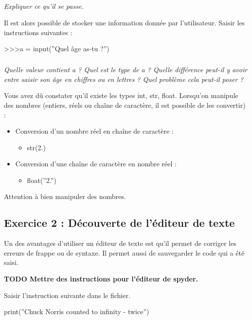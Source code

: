\documentclass[10pt]{article}
\begin{document}
\subparagraph{} 
\textit{Expliquer ce qu’il se passe.}


Il est alors possible de stocker une information donnée par l’utilisateur. Saisir les instructions suivantes : 

\begin{py}
\begin{python}
>>>a = input(''Quel âge as-tu ?'')
\end{python}
\end{py}

\subparagraph{} 
\textit{Quelle valeur contient a ? Quel est le type de a ? Quelle différence peut-il y avoir entre saisir son âge en chiffres ou en lettres ? Quel problème cela peut-il poser ?}


\begin{rem}
Vous avez dû constater qu’il existe les types int, str, float. Lorsqu’on manipule des nombres (entiers, réels ou chaîne de caractère, il est possible de les convertir) :
\begin{itemize}
\item Conversion d’un nombre réel en chaîne de caractère :
\begin{itemize}
\item \textsf{str(2.)}
\end{itemize}
\item Conversion d’une chaîne de caractère en nombre réel : 
\begin{itemize}
\item \textsf{float(''2.'')}
\end{itemize}
\end{itemize}
Attention à bien manipuler des nombres.
\end{rem}


\subsection*{Exercice 2 : Découverte de l'éditeur de texte}
\setcounter{subparagraph}{0}
Un des avantages d’utiliser un éditeur de texte est qu’il permet de corriger les erreurs de frappe ou de syntaxe. Il permet aussi de sauvegarder le code qui a été saisi. 

\textbf{TODO Mettre des instructions pour l'éditeur de spyder.}

\begin{py}
Saisir l'instruction suivante dans le fichier.
\begin{python}
print(''Chuck Norris counted to infinity - twice'')
\end{python}
\end{py}
\end{document}
